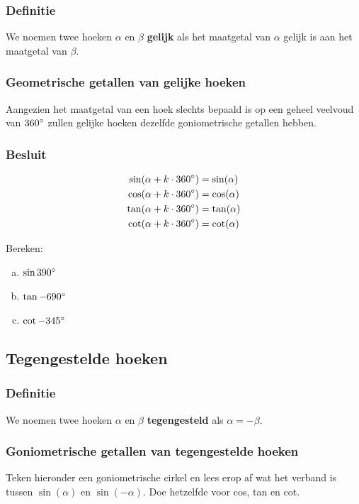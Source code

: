 \documentclass[a4paper,12pt]{article}
\begin{document}
\subsubsection*{Definitie}
We noemen twee hoeken $\alpha$ en $\beta$ \textbf{gelijk} als het maatgetal van $\alpha$ gelijk is aan het maatgetal van $\beta$.

\subsubsection*{Geometrische getallen van gelijke hoeken}
Aangezien het maatgetal van een hoek slechts bepaald is op een geheel veelvoud van $360^\circ$ zullen gelijke hoeken dezelfde goniometrische getallen hebben.

\subsubsection*{Besluit}
\begin{align*}
\sin(\alpha+k\cdot 360^\circ)&=\sin(\alpha)\\
\cos(\alpha+k\cdot 360^\circ)&=\cos(\alpha)\\
\tan(\alpha+k\cdot 360^\circ)&=\tan(\alpha)\\
\cot(\alpha+k\cdot 360^\circ)&=\cot(\alpha)\\
\end{align*}

\begin{oefening}
Bereken:
\begin{enumerate}[(a)]
  \item $\sin 390^\circ$
  \item $\tan -690^\circ$
  \item $\cot -345^\circ$
\end{enumerate}
\end{oefening}

\pagebreak
\subsection{Tegengestelde hoeken}
\subsubsection*{Definitie}
We noemen twee hoeken $\alpha$ en $\beta$ \textbf{tegengesteld} als $\alpha=-\beta$.
\subsubsection*{Goniometrische getallen van tegengestelde hoeken}
Teken hieronder een goniometrische cirkel en lees erop af wat het verband is tussen $\sin(\alpha)$ en $\sin(-\alpha)$. Doe hetzelfde voor cos, tan en cot.
\vspace*{7cm}
\end{document}
